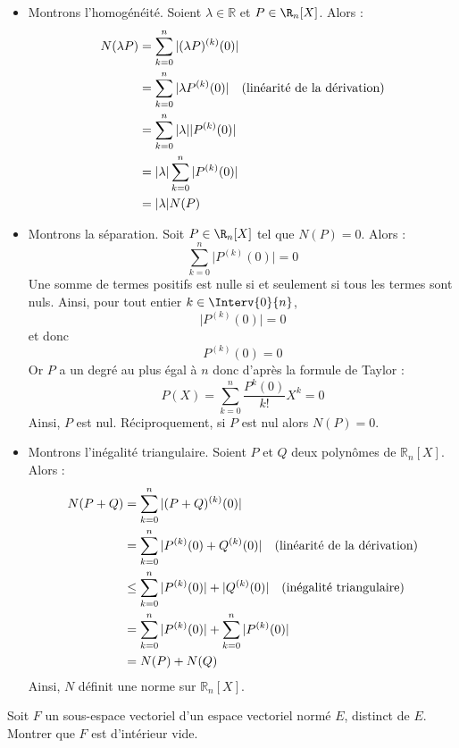 \documentclass[a4paper,10pt]{report}
\begin{document}
\begin{itemize}
\item Montrons l'homogénéité. Soient $\lambda \in \mathbb{R}$ et $P \in  \R_n[X ]$. Alors :
\begin{align*}
N(\lambda P) & =  \sum_{k = 0}^{ n } \vert (\lambda P)^{(k)} (0) \vert  \\
& =  \sum_{k = 0}^{ n }  \vert \lambda P^{(k)} (0) \vert \quad \hbox{(linéarité de la dérivation)} \\
& =  \sum_{k = 0}^{ n } \vert \lambda \vert \vert P^{(k)} (0) \vert \\
& = \vert \lambda \vert \sum_{k = 0}^{ n } \vert P^{(k)} (0) \vert \\
& = \vert \lambda \vert N(P) 
\end{align*}
\item Montrons la séparation. Soit $P \in  \R_n[X ]$ tel que $N(P)=0$. Alors :  
$$ \sum_{k = 0}^{ n } \vert P^{(k)} (0) \vert =0$$
Une somme de termes positifs est nulle si et seulement si tous les termes sont nuls. Ainsi, pour tout entier $k \in \Interv{0}{n}$,
$$  \vert P^{(k)} (0) \vert = 0$$
et donc 
$$   P^{(k)} (0)  = 0$$
Or $P$ a un degré au plus égal à $n$ donc d'après la formule de Taylor :
$$ P(X) = \sum_{k=0}^n \dfrac{P^{k}(0)}{k!} X^k = 0$$
Ainsi, $P$ est nul. Réciproquement, si $P$ est nul alors $N(P)=0$.
\item Montrons l'inégalité triangulaire. Soient $P$ et $Q$ deux polynômes de $\mathbb{R}_n[X]$. Alors :
\begin{align*}
N(P+Q) & = \sum_{k = 0}^{ n } \vert (P+Q)^{(k)} (0) \vert \\
& = \sum_{k = 0}^{ n } \vert P^{(k)} (0) +  Q^{(k)} (0) \vert \quad \hbox{(linéarité de la dérivation)} \\
& \leq \sum_{k = 0}^{ n } \vert P^{(k)} (0) \vert +  \vert Q^{(k)} (0) \vert \quad \hbox{(inégalité triangulaire)} \\
& = \sum_{k = 0}^{ n } \vert P^{(k)} (0) \vert + \sum_{k = 0}^{ n } \vert P^{(k)} (0) \vert \\
& = N(P) + N(Q)
\end{align*}
Ainsi, $N$ définit une norme sur $\mathbb{R}_n[X]$.
\end{itemize}

\begin{Exa} Soit $F$ un sous-espace vectoriel d'un espace vectoriel normé $E$, distinct de $E$. Montrer que $F$ est d'intérieur vide.
\end{Exa}
\end{document}
